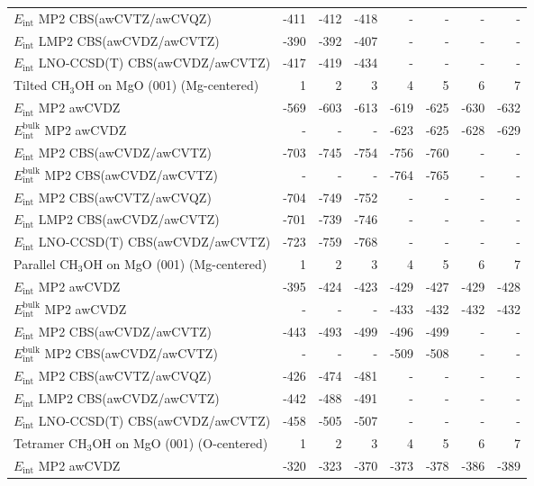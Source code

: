 \begin{longtable}{lrrrrrrr}
$E_\textrm{int}$ MP2 CBS(awCVTZ/awCVQZ) & -411 & -412 & -418 & - & - & - & - \\
$E_\textrm{int}$ LMP2 CBS(awCVDZ/awCVTZ) & -390 & -392 & -407 & - & - & - & - \\
$E_\textrm{int}$ LNO-CCSD(T) CBS(awCVDZ/awCVTZ) & -417 & -419 & -434 & - & - & - & - \\
\toprule
Tilted CH$_3$OH on MgO (001) (Mg-centered) & 1 & 2 & 3 & 4 & 5 & 6 & 7 \\ 
\midrule
$E_\textrm{int}$ MP2 awCVDZ & -569 & -603 & -613 & -619 & -625 & -630 & -632 \\
$E_\textrm{int}^\textrm{bulk}$ MP2 awCVDZ & - & - & - & -623 & -625 & -628 & -629 \\
$E_\textrm{int}$ MP2 CBS(awCVDZ/awCVTZ) & -703 & -745 & -754 & -756 & -760 & - & - \\
$E_\textrm{int}^\textrm{bulk}$ MP2 CBS(awCVDZ/awCVTZ) & - & - & - & -764 & -765 & - & - \\
$E_\textrm{int}$ MP2 CBS(awCVTZ/awCVQZ) & -704 & -749 & -752 & - & - & - & - \\
$E_\textrm{int}$ LMP2 CBS(awCVDZ/awCVTZ) & -701 & -739 & -746 & - & - & - & - \\
$E_\textrm{int}$ LNO-CCSD(T) CBS(awCVDZ/awCVTZ) & -723 & -759 & -768 & - & - & - & - \\
\toprule
Parallel CH$_3$OH on MgO (001) (Mg-centered) & 1 & 2 & 3 & 4 & 5 & 6 & 7 \\ 
\midrule
$E_\textrm{int}$ MP2 awCVDZ & -395 & -424 & -423 & -429 & -427 & -429 & -428 \\
$E_\textrm{int}^\textrm{bulk}$ MP2 awCVDZ & - & - & - & -433 & -432 & -432 & -432 \\
$E_\textrm{int}$ MP2 CBS(awCVDZ/awCVTZ) & -443 & -493 & -499 & -496 & -499 & - & - \\
$E_\textrm{int}^\textrm{bulk}$ MP2 CBS(awCVDZ/awCVTZ) & - & - & - & -509 & -508 & - & - \\
$E_\textrm{int}$ MP2 CBS(awCVTZ/awCVQZ) & -426 & -474 & -481 & - & - & - & - \\
$E_\textrm{int}$ LMP2 CBS(awCVDZ/awCVTZ) & -442 & -488 & -491 & - & - & - & - \\
$E_\textrm{int}$ LNO-CCSD(T) CBS(awCVDZ/awCVTZ) & -458 & -505 & -507 & - & - & - & - \\
\toprule
Tetramer CH$_3$OH on MgO (001) (O-centered) & 1 & 2 & 3 & 4 & 5 & 6 & 7 \\ 
\midrule
$E_\textrm{int}$ MP2 awCVDZ & -320 & -323 & -370 & -373 & -378 & -386 & -389 \\

\end{longtable}
